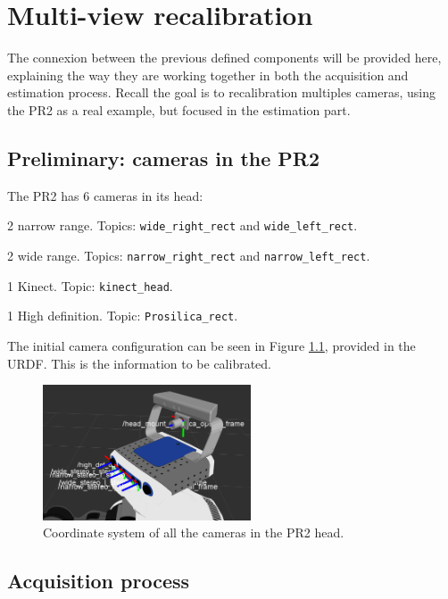 \chapter{Multi-view recalibration}
\label{cha:multi-view calibration}

The connexion between the previous defined components will be provided here, explaining the way they are working together in both the acquisition and estimation process. Recall the goal is to recalibration multiples cameras, using the PR2 as a real example, but focused in the estimation part.

\section{Preliminary: cameras in the PR2}

The PR2 has 6 cameras in its head:
\begin{itemize*}
 \item 2 narrow range. Topics: \texttt{wide\_right\_rect} and \texttt{wide\_left\_rect}.
 \item 2 wide range. Topics: \texttt{narrow\_right\_rect} and \texttt{narrow\_left\_rect}.
 \item 1 Kinect. Topic: \texttt{kinect\_head}.
 \item 1 High definition. Topic: \texttt{Prosilica\_rect}.
\end{itemize*}

\noindent
The initial camera configuration can be seen in Figure \ref{fig:pr2_cameras}, provided in the URDF. This is the information to be calibrated.
\begin{figure}[!htbp]
 \centering
 \includegraphics[width=0.55\textwidth]{images/screenshots/PR2_cameras.png}
 \caption{Coordinate system of all the cameras in the PR2 head.}
 \label{fig:pr2_cameras}
\end{figure}






\section{Acquisition process}
\label{sec:acquisition}

